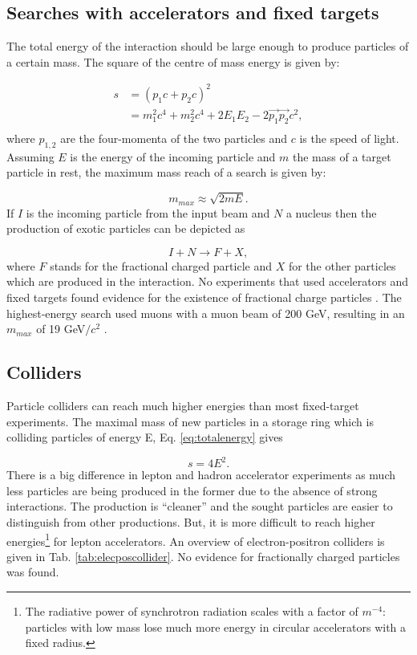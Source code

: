 \subsection{Searches with accelerators and fixed targets}
The total energy of the interaction should be large enough to produce particles of a certain mass. The square of the centre of mass energy is given by:

\begin{equation}
\label{eq:totalenergy}
\begin{split}
s &= \left(p_1c + p_2c\right)^2\\
&= m_1^2c^4 + m_2^2c^4 + 2E_1E_2 - 2\vec{p_1}\vec{p_2}c^2,\\
\end{split}
\end{equation}
where $p_{1,2}$ are the four-momenta of the two particles and $c$ is the speed of light.
Assuming $E$ is the energy of the incoming particle and $m$ the mass of a target particle in rest, the maximum mass reach of a search is given by:

\begin{equation}
m_{max} \approx \sqrt{2 m E}.
\end{equation}
If $I$ is the incoming particle from the input beam and $N$ a nucleus then the production of exotic particles can be depicted as

\begin{equation}
I + N \rightarrow F + X,
\end{equation}
where $F$ stands for the fractional charged particle and $X$ for the other particles which are produced in the interaction. No experiments that used accelerators and fixed targets found evidence for the existence of fractional charge particles \cite{Lyons:1984pw}. The highest-energy search used muons with a muon beam of 200 GeV, resulting in an $m_{max}$ of 19 GeV$/c^2$ \cite{Aubert:1983jy}.
\subsection{Colliders}
Particle colliders can reach much higher energies than most fixed-target experiments. The maximal mass of new particles in a storage ring which is colliding particles of energy E, Eq. \ref{eq:totalenergy} gives

\begin{equation}
s = 4E^2.
\end{equation}
There is a big difference in lepton and hadron accelerator experiments as much less particles are being produced in the former due to the absence of strong interactions. The production is ``cleaner'' and the sought particles are easier to distinguish from other productions. But, it is more difficult to reach higher energies\footnote{The radiative power of synchrotron radiation scales with a factor of $m^{-4}$: particles with low mass lose much more energy in circular accelerators with a fixed radius.} for lepton accelerators. An overview of electron-positron colliders is given in Tab. \ref{tab:elecposcollider}. No evidence for fractionally charged particles was found.


